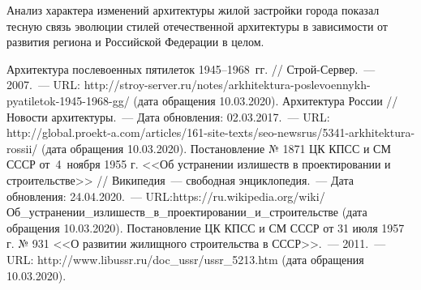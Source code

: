 Анализ характера изменений архитектуры жилой застройки города показал тесную связь эволюции стилей отечественной архитектуры в зависимости от развития региона и Российской Федерации в целом.

\begin{thebibliography}{99}
\bibitem{}Архитектура послевоенных пятилеток 1945--1968~гг. // Строй-Сервер.~--- 2007.~--- URL: http://stroy-server.ru/notes/arkhitektura-poslevoennykh-pyatiletok-1945-1968-gg/ (дата обращения 10.03.2020).
\bibitem{}Архитектура России // Новости архитектуры.~--- Дата обновления: 02.03.2017.~--- URL: http://global.proekt-a.com/articles/161-site-texts/seo-newsrus/5341-arkhitektura-rossii/ (дата обращения 10.03.2020).
\bibitem{}Постановление № 1871 ЦК КПСС и СМ СССР от 4 ноября 1955 г. <<Об устранении излишеств в проектировании и строительстве>> // Википедия~--- свободная энциклопедия.~--- Дата обновления: 24.04.2020.~--- URL:https://ru.wikipedia.org/wiki/Об\_устранении\_излишеств\_в\_про\-ек\-ти\-ро\-ван\-ии\_и\_строительстве (дата обращения 10.03.2020).
\bibitem{}Постановление ЦК КПСС и СМ СССР от 31 июля 1957 г. № 931 <<О развитии жилищного строительства в СССР>>.~--- 2011.~--- URL: http://www.libussr.ru/doc\_ussr/ussr\_5213.htm (дата обращения 10.03.2020).

\end{thebibliography}

